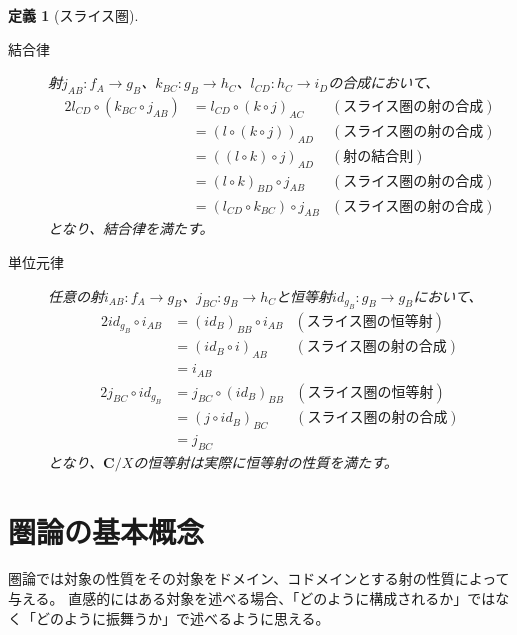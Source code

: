 \documentclass[dvipdfmx]{jsarticle}
\newcommand{\cat}[1]{\boldsymbol{#1}}
\newcommand{\arrow}{\rightarrow}
\newcommand{\mor}[3]{#1:#2\arrow #3}
\newtheorem{define}{定義}[section]
\numberwithin{proof}{subsection}
\numberwithin{prop}{subsection}
\numberwithin{define}{subsection}
\begin{document}
\begin{define}[スライス圏]
\begin{description}
\begin{center}
			\end{center}

			\item[結合律] 射$\mor{j_{AB}}{f_A}{g_B}$、$\mor{k_{BC}}{g_B}{h_C}$、$\mor{l_{CD}}{h_C}{i_D}$の合成において、
			\begin{alignat*}{2}
				l_{CD}\circ (k_{BC}\circ j_{AB})&=l_{CD}\circ(k\circ j)_{AC}&(スライス圏の射の合成) \\
				&=(l\circ(k\circ j))_{AD}&(スライス圏の射の合成) \\
				&=((l\circ k)\circ j)_{AD}&(射の結合則) \\
				&=(l\circ k)_{BD}\circ j_{AB}&(スライス圏の射の合成) \\
				&=(l_{CD}\circ k_{BC})\circ j_{AB}&(スライス圏の射の合成)
			\end{alignat*}
			となり、結合律を満たす。
			\item[単位元律] 任意の射$\mor{i_{AB}}{f_A}{g_B}$、$\mor{j_{BC}}{g_B}{h_C}$と恒等射$\mor{id_{g_B}}{g_B}{g_B}$において、
			\begin{alignat*}{2}
				id_{g_B}\circ i_{AB}&=(id_B)_{BB}\circ i_{AB}&(スライス圏の恒等射)\\
				&=(id_B\circ i)_{AB}&(スライス圏の射の合成)\\
				&=i_{AB}
			\end{alignat*}
			\begin{alignat*}{2}
				j_{BC}\circ id_{g_B}&=j_{BC}\circ (id_B)_{BB}&(スライス圏の恒等射)\\
				&=(j\circ id_B)_{BC}&(スライス圏の射の合成)\\
				&=j_{BC}
			\end{alignat*}
			となり、$\cat{C}/X$の恒等射は実際に恒等射の性質を満たす。
		\end{description}
	\end{define}

	\section{圏論の基本概念}
	圏論では対象の性質をその対象をドメイン、コドメインとする射の性質によって与える。
	直感的にはある対象を述べる場合、「どのように構成されるか」ではなく「どのように振舞うか」で述べるように思える。
\end{document}
